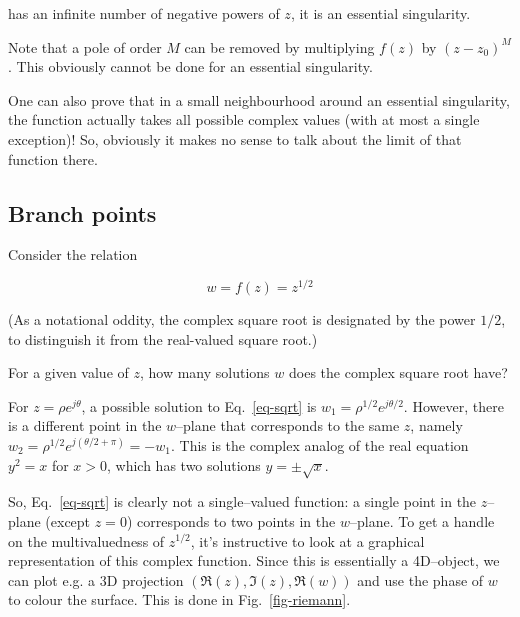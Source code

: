 has an infinite number of negative powers of $z$, it is an essential singularity.

Note that a pole of order $M$ can be removed by multiplying $f(z)$ by $(z-z_0)^M$. This obviously cannot be done for an essential singularity.

\noindent{}One can also prove that in a small neighbourhood around an essential singularity, the function actually takes all possible complex values (with at most a single exception)! So, obviously it makes no sense to talk about the limit of that function there.

\pagebreak

\subsection*{Branch points}

Consider the relation

\begin{equation}
w = f(z) = z^{1/2} \label{eq-sqrt}
\end{equation}

(As a notational oddity, the complex square root is designated by the power $1/2$, to distinguish it from the real-valued square root.)

\begin{cue}
For a given value of $z$, how many solutions $w$ does the complex square root have? 
\end{cue}

For $z=\rho e^{j\theta}$, a possible solution to Eq.~\ref{eq-sqrt} is $w_1 = \rho^{1/2} e^{j\theta/2}$. However, there is a different point in the $w$--plane that corresponds to the same $z$, namely $w_2 = \rho^{1/2} e^{j(\theta/2+\pi)} = -w_1$. This is the complex analog of the real equation $y^2 = x$ for $x > 0$, which has two solutions $y = \pm \sqrt{x}$.

So, Eq.~\ref{eq-sqrt} is clearly not a single--valued function: a single point in the $z$--plane (except $z=0$) corresponds to two points in the $w$--plane. To get a handle on the multivaluedness of $z^{1/2}$, it's instructive to look at a graphical representation of this complex function. Since this is essentially a 4D--object, we can plot e.g. a 3D projection $(\Re(z),\Im(z),\Re(w))$ and use the phase of $w$ to colour the surface. This is done in Fig.~\ref{fig-riemann}.


